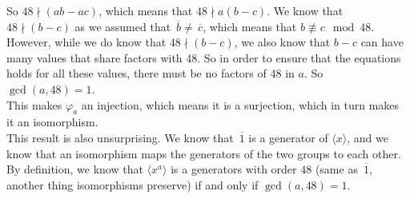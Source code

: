 \documentclass{article}
\newcommand{\olsi}[1]{\,\overline{\!{#1}}}
\begin{document}
    So $48 \nmid (ab - ac)$,
    which means that $48 \nmid a(b - c)$.
    We know that $48 \nmid (b - c)$
    as we assumed that $\olsi{b} \neq \olsi{c}$,
    which means that $b \not\equiv c \mod 48$.
    However, while we do know that $48 \nmid (b - c)$,
    we also know that $b - c$ can have many values that
    share factors with 48.
    So in order to ensure that the equations holds for all these values,
    there must be no factors of 48 in $a$.
    So $\gcd(a, 48) = 1$. \\
    This makes $\varphi_a$ an injection,
    which means it is a surjection,
    which in turn makes it an isomorphism. \\
    This result is also unsurprising.
    We know that $\olsi{1}$ is a generator of $\langle x \rangle$,
    and we know that an isomorphism maps the generators of the
    two groups to each other.
    By definition, we know that $\langle x^a \rangle$
    is a generators with order $48$
    (same as $\olsi{1}$, another thing isomorphisms preserve)
    if and only if $\gcd(a, 48) = 1$.
\end{document}
